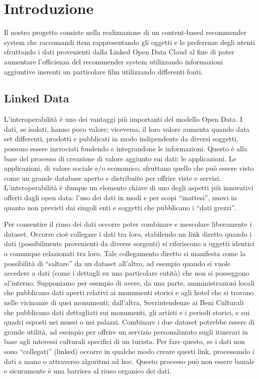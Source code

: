 \section{Introduzione}
Il nostro progetto consiste nella realizzazione di un content-based recommender system che raccomandi item rappresentando gli oggetti e le preferenze degli utenti sfruttando i dati provenienti dalla Linked Open Data Cloud al fine di poter aumentare l'efficienza del recommender system utilizzando informazioni aggiuntive inerenti un particolare film utilizzando differenti fonti.

\subsection{Linked Data}
L’interoperabilità è uno dei vantaggi più importanti del modello Open Data. I dati, se isolati, hanno poco valore; viceversa, il loro valore aumenta quando data set differenti, prodotti e pubblicati in modo indipendente da diversi soggetti, possono essere incrociati fondendo e integrandone le informazioni. Questo è alla base del processo di creazione di valore aggiunto sui dati: le applicazioni. Le applicazioni, di valore sociale e/o economico, sfruttano quello che può essere visto come un grande database aperto e distribuito per offrire viste e servizi. L’interoperabilità è dunque un elemento chiave di uno degli aspetti più innovativi offerti dagli open data: l’uso dei dati in modi e per scopi “inattesi”, nuovi in quanto non previsti dai singoli enti e soggetti che pubblicano i “dati grezzi”.

Per consentire il riuso dei dati occorre poter combinare e mescolare liberamente i dataset. Occorre cioè collegare i dati tra loro, stabilendo un link diretto quando i dati (possibilmente provenienti da diverse sorgenti) si riferiscono a oggetti identici o comunque relazionati tra loro. Tale collegamento diretto si manifesta come la possibilità di “saltare” da un dataset all’altro, ad esempio quando si vuole accedere a dati (come i dettagli su una particolare entità) che non si posseggono al’interno.
Supponiamo per esempio di avere, da una parte, amministrazioni locali che pubblicano dati aperti relativi ai monumenti storici e agli hotel che si trovano nelle vicinanze di quei monumenti; dall’altra, Sovrintendenze ai Beni Culturali che pubblicano dati dettagliati sui monumenti, gli artisti e i periodi storici, e sui quadri esposti nei musei o nei palazzi.
Combinare i due dataset potrebbe essere di grande utilità, ad esempio per offrire un servizio personalizzato sugli itinerari in base agli interessi culturali specifici di un turista.
Per fare questo, se i dati non sono “collegati” (linked) occorre in qualche modo creare questi link, processando i dati a mano o attraverso algoritmi ad hoc. Questo processo può non essere banale e sicuramente è una barriera al riuso organico dei dati.

